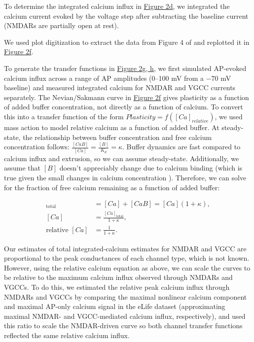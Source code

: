 To determine the integrated calcium influx in \hyperref[fig:1]{Figure 2d}, we integrated the calcium current evoked by the voltage step after subtracting the baseline current (NMDARs are partially open at rest). 

We used plot digitization to extract the data from Figure 4 of \citep{nevianSpineCa2Signaling2006} and replotted it in \hyperref[fig:2]{Figure 2f}.

To generate the transfer functions in \hyperref[fig:2]{Figure 2g, h}, we first simulated AP-evoked calcium influx across a range of AP amplitudes (0--100 mV from a $-70$ mV baseline) and measured integrated calcium for NMDAR and VGCC currents separately. The Nevian/Sakmann curve in \hyperref[fig:2]{Figure 2f} gives plasticity as a function of added buffer concentration, not directly as a function of calcium. To convert this into a transfer function of the form $Plasticity = f([Ca]_{relative})$, we used mass action to model relative calcium as a function of added buffer. At steady-state, the relationship between buffer concentration and free calcium concentration follows: $\frac{[CaB]}{[Ca]} = \frac{[B]}{K_d} = \kappa$. Buffer dynamics are fast compared to calcium influx and extrusion, so we can assume steady-state. Additionally, we assume that $[B]$ doesn't appreciably change due to calcium binding (which is true given the small changes in calcium concentration \citep{sabatiniLifeCycleCa22002}). Therefore, we can solve for the fraction of free calcium remaining as a function of added buffer:

\begin{align*}
[Ca]_{\mathrm{total}} &= [Ca] + [CaB] = [Ca](1+\kappa), \\
[Ca] &= \frac{[Ca]_{\mathrm{total}}}{1+\kappa}, \\
\text{relative }[Ca] &= \frac{1}{1+\kappa}.
\end{align*}

Our estimates of total integrated-calcium estimates for NMDAR and VGCC are proportional to the peak conductances of each channel type, which is not known. However, using the relative calcium equation as above, we can scale the curves to be relative to the maximum calcium influx observed through NMDARs and VGCCs. To do this, we estimated the relative peak calcium influx through NMDARs and VGCCs by comparing the maximal nonlinear calcium component and maximal AP-only calcium signal in the eLife dataset (approximating maximal NMDAR- and VGCC-mediated calcium influx, respectively), and used this ratio to scale the NMDAR-driven curve so both channel transfer functions reflected the same relative calcium influx.

